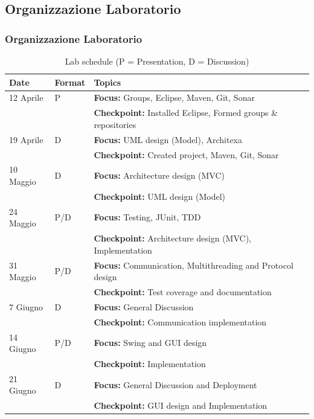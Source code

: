 \documentclass{beamer}
\begin{document}
\subsection{Organizzazione Laboratorio}
\begin{frame}
\frametitle{Organizzazione Laboratorio}


\begin{table}
  \centering
\footnotesize

\begin{tabular}{ l l l }
\toprule

\setlength{\columnsep}{0.01cm}

Date & Format & Topics \\
\midrule
  12 Aprile & P & \textbf{Focus:} Groups, Eclipse, Maven, Git, Sonar\\
  && \textbf{Checkpoint:} Installed Eclipse, Formed groups \& repositories\\
  19 Aprile & D & \textbf{Focus:} UML design (Model), Architexa \\
  && \textbf{Checkpoint:} Created project, Maven, Git, Sonar \\
  10 Maggio & D & \textbf{Focus:} Architecture design (MVC) \\
  && \textbf{Checkpoint:} UML design (Model) \\
  24 Maggio & P/D & \textbf{Focus:} Testing, JUnit, TDD \\
  && \textbf{Checkpoint:} Architecture design (MVC), Implementation\\
  31 Maggio & P/D & \textbf{Focus:} Communication, Multithreading and Protocol design\\
  && \textbf{Checkpoint:} Test coverage and documentation\\
  7 Giugno & D & \textbf{Focus:} General Discussion \\
  && \textbf{Checkpoint:} Communication implementation\\
  14 Giugno & P/D & \textbf{Focus:} Swing and GUI design \\
  && \textbf{Checkpoint:} Implementation\\
  21 Giugno & D & \textbf{Focus:} General Discussion and Deployment \\
  && \textbf{Checkpoint:} GUI design and Implementation\\

\bottomrule
\end{tabular}
\caption{Lab schedule (P = Presentation, D = Discussion)}
\label{schedule}
\end{table}

\end{frame}
\end{document}
